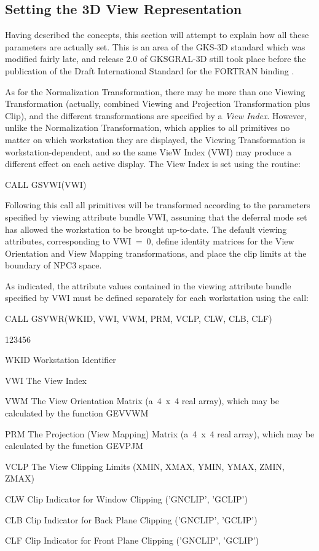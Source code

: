 \subsection{Setting the 3D View Representation}
 
Having described the concepts, this section will attempt to explain
how all these parameters are actually set. This is an area of
the GKS-3D standard which was modified fairly late,
and release 2.0 of GKSGRAL-3D still took place before the publication
of the Draft International Standard for the FORTRAN binding
\cite{bib-gksftn3}.
 
As for the Normalization Transformation, there may be more than one
Viewing Transformation (actually, combined Viewing and Projection
Transformation plus Clip), and the different transformations
are specified by a {\it View Index}.
However, unlike the Normalization Transformation, which applies to all
primitives no matter on which workstation they are displayed,
the Viewing Transformation is workstation-dependent, and so the
same VieW Index (VWI) may produce a different effect on each active display.
The View Index is set using the routine:
\begin{XMP}
CALL GSVWI(VWI)
\end{XMP}
Following this call all primitives will be transformed according to the
parameters specified by viewing attribute bundle VWI, assuming that
the deferral mode set has allowed the workstation to be brought
up-to-date. The default viewing attributes,
corresponding to VWI~=~0,
define identity matrices for the View Orientation and View Mapping
transformations, and place the clip limits at the boundary of NPC3 space.
 
As indicated, the attribute values contained in
the viewing attribute bundle specified by VWI must be defined separately
for each workstation using the call:
\begin{XMP}
CALL GSVWR(WKID, VWI, VWM, PRM, VCLP, CLW, CLB, CLF)
\end{XMP}
\begin{DLtt}{123456}
\item[WKID]Workstation Identifier
\item[VWI]The View Index
\item[VWM]The View Orientation Matrix (a~4~x~4 real array),
which may be calculated by the function GEVVWM
\item[PRM]The Projection (View Mapping) Matrix
(a~4~x~4 real array),
which may be calculated by the function GEVPJM
\item[VCLP]The View Clipping Limits (XMIN, XMAX, YMIN, YMAX, ZMIN, ZMAX)
\item[CLW]Clip Indicator for Window Clipping ('GNCLIP', 'GCLIP')
\item[CLB]Clip Indicator for Back Plane Clipping ('GNCLIP', 'GCLIP')
\item[CLF]Clip Indicator for Front Plane Clipping ('GNCLIP', 'GCLIP')
\end{DLtt}
 
